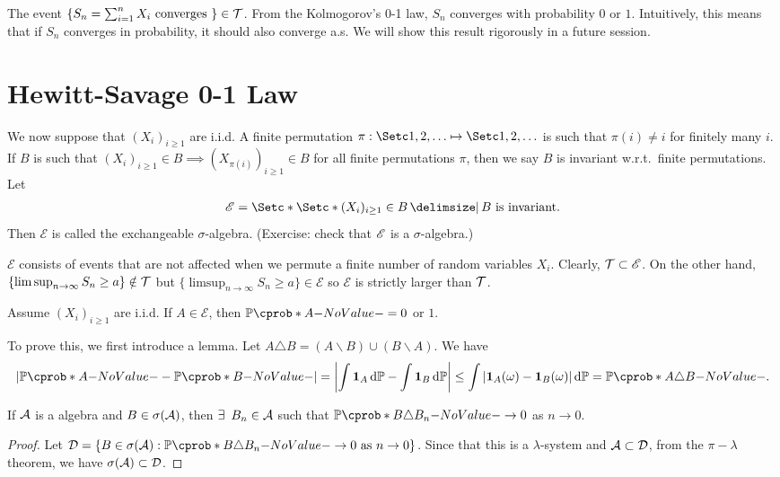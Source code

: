 \documentclass[12pt]{article}
\begin{document}
\begin{Example}
The event $\{S_n = \sum_{i=1}^n X_i \text{ converges } \}\in \mathcal{T}$. From the Kolmogorov’s 0-1 law, $S_n$ converges with probability $0$ or $1$. Intuitively, this means that if $S_n$ converges in probability, it should also converge a.s. We will show this result rigorously in a future session.
\end{Example}

\section{Hewitt-Savage 0-1 Law}

We now suppose that $(X_i) _{i \geq 1 }$ are i.i.d. A finite permutation $\pi : \set{1,2,\ldots} \mapsto \set{1,2,\ldots}$ is such that $\pi(i)\neq i$ for finitely many $i$. If $B$ is such that $(X_i)_{i\geq1}\in B \implies (X_{\pi(i)})_{i\geq1}\in B$ for all finite permutations $\pi$, then we say $B$ is invariant w.r.t.\ finite permutations. Let 
\begin{align*}
\mathscr{E}=\set*{\set*{(X_i) _{i \geq 1 }\in B}\given B \text{ is invariant}}.
\end{align*}
Then $\mathscr{E}$ is called the exchangeable $\sigma$-algebra. (Exercise: check that $\mathscr{E}$ is a $\sigma$-algebra.)

$\mathscr{E}$ consists of events that are not affected when we permute a finite number of random variables $X_i$. Clearly, $\mathcal{T} \subset \mathscr{E}$. On the other hand, $\{\limsup_{n\to\infty} S_n\geq a\}\notin \mathcal{T}$ but $\{\limsup_{n\to\infty} S_n\geq a\}\in \mathscr{E}$ so $\mathscr{E}$ is strictly larger than $\mathcal{T}$.

\begin{Theorem} 
Assume $(X_i)_{i\geq 1}$ are i.i.d. If $A \in \mathscr{E}$, then $\P(A)=0$ or $1$.
\end{Theorem}

To prove this, we first introduce a lemma. Let $A\triangle B= (A\backslash B)\cup (B\backslash A)$. We have 
\begin{align*}
|\P(A)-\P(B)|= \left|\int \indicatore{A} \ud\P -\int \indicatore{B} \ud\P\right|\leq \int |\indicatore{A}(\omega)-\indicatore{B}(\omega)| \ud \P =\P(A\triangle B).
\end{align*}

\begin{Lemma}\label{wk8:lemma:Approximation Lemma}
If $\mathcal{A}$ is a algebra and $B \in \sigma(\mathcal{A})$, then $\exists\ B_n \in \calA$ such that $\P(B\triangle B_n)\to 0$ as $n \to 0$. 
\end{Lemma}
\begin{proof}
Let $\calD=\{B\in \sigma(\calA): \P(B\triangle B_n)\to 0 \text{ as }  n \to 0 \}$. Since that this is a $\lambda$-system and $\mathcal{A} \subset \mathcal{D}$, from the $\pi-\lambda$ theorem, we have $\sigma(\mathcal{A}) \subset \mathcal{D}$. 
\end{proof}
\end{document}
